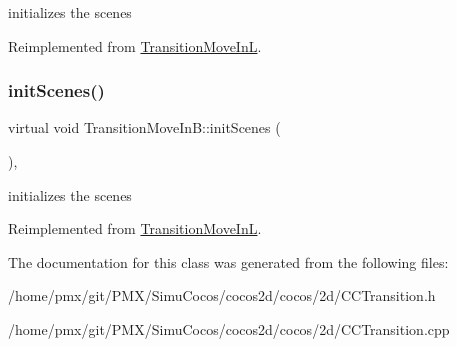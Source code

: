 initializes the scenes 

Reimplemented from \hyperlink{classTransitionMoveInL_aeb7630758110537b1098673f21d7d197}{Transition\+Move\+InL}.

\mbox{\label{classTransitionMoveInB_ad262522b11cb2c360964857393316437}} 
\subsubsection{\texorpdfstring{init\+Scenes()}{initScenes()}\hspace{0.1cm}{\footnotesize\ttfamily [2/2]}}
{\footnotesize\ttfamily virtual void Transition\+Move\+In\+B\+::init\+Scenes (\begin{DoxyParamCaption}{ }\end{DoxyParamCaption})\hspace{0.3cm}{\ttfamily [protected]}, {\ttfamily [virtual]}}

initializes the scenes 

Reimplemented from \hyperlink{classTransitionMoveInL_aeb7630758110537b1098673f21d7d197}{Transition\+Move\+InL}.



The documentation for this class was generated from the following files\+:\begin{DoxyCompactItemize}
\item 
/home/pmx/git/\+P\+M\+X/\+Simu\+Cocos/cocos2d/cocos/2d/C\+C\+Transition.\+h\item 
/home/pmx/git/\+P\+M\+X/\+Simu\+Cocos/cocos2d/cocos/2d/C\+C\+Transition.\+cpp\end{DoxyCompactItemize}
